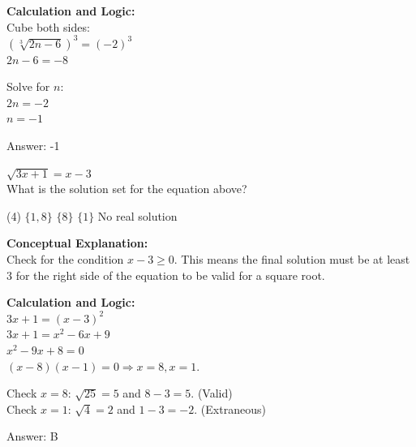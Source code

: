 \documentclass[11pt,paper=a4,answers]{exam}
\begin{document}
\begin{questions}
\begin{solution}
\vspace{20pt}

\textbf{Calculation and Logic:} \\
Cube both sides: \\
$(\sqrt[3]{2n - 6})^3 = (-2)^3$ \\
$2n - 6 = -8$

\vspace{10pt}

Solve for $n$: \\
$2n = -2$ \\
$n = -1$

\vspace{25pt}

Answer: \colorbox{yellow!100}{-1}
\end{solution}

\vspace{40pt}

\question
$\sqrt{3x + 1} = x - 3$ \\
What is the solution set for the equation above?
\begin{tasks}(4)
    \task $\{1, 8\}$
    \task $\{8\}$
    \task $\{1\}$
    \task No real solution
\end{tasks}

\begin{solution}
\textbf{Conceptual Explanation:} \\
Check for the condition $x - 3 \geq 0$. This means the final solution must be at least 3 for the right side of the equation to be valid for a square root.

\vspace{20pt}

\textbf{Calculation and Logic:} \\
$3x + 1 = (x - 3)^2$ \\
$3x + 1 = x^2 - 6x + 9$ \\
$x^2 - 9x + 8 = 0$ \\
$(x - 8)(x - 1) = 0 \Rightarrow x = 8, x = 1$.

\vspace{10pt}

Check $x = 8$: $\sqrt{25} = 5$ and $8 - 3 = 5$. (Valid) \\
Check $x = 1$: $\sqrt{4} = 2$ and $1 - 3 = -2$. (Extraneous)

\vspace{25pt}

Answer: \colorbox{yellow!100}{B}
\end{solution}


\end{questions}
\end{document}

